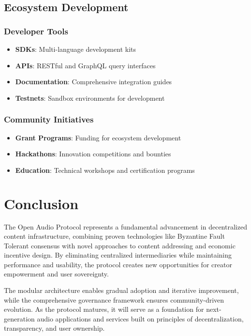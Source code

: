 \documentclass[11pt,a4paper]{article}
\begin{document}
\subsection{Ecosystem Development}

\subsubsection{Developer Tools}
\begin{itemize}
  \item \textbf{SDKs}: Multi-language development kits
  \item \textbf{APIs}: RESTful and GraphQL query interfaces
  \item \textbf{Documentation}: Comprehensive integration guides
  \item \textbf{Testnets}: Sandbox environments for development
\end{itemize}

\subsubsection{Community Initiatives}
\begin{itemize}
  \item \textbf{Grant Programs}: Funding for ecosystem development
  \item \textbf{Hackathons}: Innovation competitions and bounties
  \item \textbf{Education}: Technical workshops and certification programs
\end{itemize}

\section{Conclusion}

The Open Audio Protocol represents a fundamental advancement in decentralized content infrastructure, combining proven technologies like Byzantine Fault Tolerant consensus with novel approaches to content addressing and economic incentive design. By eliminating centralized intermediaries while maintaining performance and usability, the protocol creates new opportunities for creator empowerment and user sovereignty.

The modular architecture enables gradual adoption and iterative improvement, while the comprehensive governance framework ensures community-driven evolution. As the protocol matures, it will serve as a foundation for next-generation audio applications and services built on principles of decentralization, transparency, and user ownership.
\end{document}
